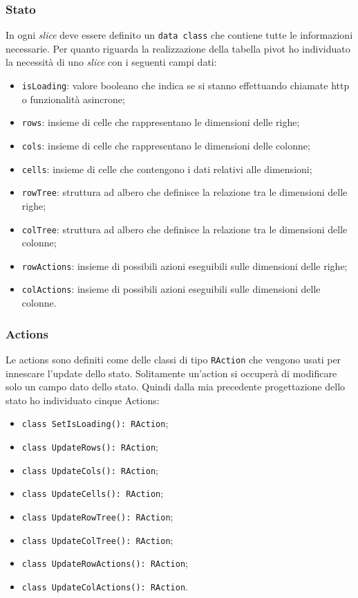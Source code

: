 \subsubsection*{Stato}
In ogni \emph{slice} deve essere definito un \verb|data class| che contiene tutte le informazioni necessarie. Per quanto riguarda la realizzazione della tabella pivot ho individuato la necessità di uno \emph{slice} con i seguenti campi dati:
\begin{itemize}
	\item \verb|isLoading|: valore booleano che indica se si stanno effettuando chiamate http o funzionalità asincrone;
	\item \verb|rows|: insieme di celle che rappresentano le dimensioni delle righe;
	\item \verb|cols|: insieme di celle che rappresentano le dimensioni delle colonne;
	\item \verb|cells|: insieme di celle che contengono i dati relativi alle dimensioni;
	\item \verb|rowTree|: struttura ad albero che definisce la relazione tra le dimensioni delle righe;
	\item \verb|colTree|: struttura ad albero che definisce la relazione tra le dimensioni delle colonne;
	\item \verb|rowActions|: insieme di possibili azioni eseguibili sulle dimensioni delle righe;
	\item \verb|colActions|: insieme di possibili azioni eseguibili sulle dimensioni delle colonne.
\end{itemize}

\subsubsection*{Actions}
Le actions sono definiti come delle classi di tipo \verb|RAction| che vengono usati per innescare l'update dello stato. Solitamente un'action si occuperà di modificare solo un campo dato dello stato. Quindi dalla mia precedente progettazione dello stato ho individuato cinque Actions:
\begin{itemize}
	\item \verb|class SetIsLoading(): RAction|;
	\item \verb|class UpdateRows(): RAction|;
	\item \verb|class UpdateCols(): RAction|;
	\item \verb|class UpdateCells(): RAction|;
	\item \verb|class UpdateRowTree(): RAction|;
	\item \verb|class UpdateColTree(): RAction|;
	\item \verb|class UpdateRowActions(): RAction|;
	\item \verb|class UpdateColActions(): RAction|.
\end{itemize}

